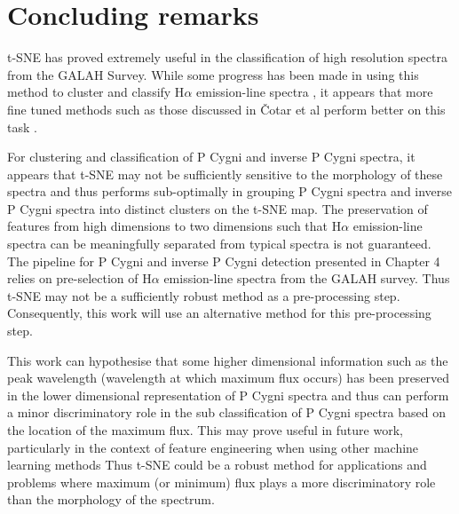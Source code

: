 \section{Concluding remarks}

t-SNE has proved extremely useful in the classification of high resolution spectra from the GALAH Survey. While some progress has been made in using this method to cluster and classify H$\alpha$ emission-line spectra \citep{traven2017galah}, it appears that more fine tuned methods such as those discussed in Čotar et al perform better on this task \citep{vcotar2021galah}.

For clustering and classification of P Cygni and inverse P Cygni spectra, it appears that t-SNE may not be sufficiently sensitive to the morphology of these spectra and thus performs sub-optimally in grouping P Cygni spectra and inverse P Cygni spectra into distinct clusters on the t-SNE map. The preservation of features from high dimensions to two dimensions such that H$\alpha$ emission-line spectra can be meaningfully separated from typical spectra is not guaranteed. The pipeline for P Cygni and inverse P Cygni detection presented in Chapter 4 relies on pre-selection of H$\alpha$ emission-line spectra from the GALAH survey. Thus t-SNE may not be a sufficiently robust method as a pre-processing step. Consequently, this work will use an alternative method for this pre-processing step.

This work can hypothesise that some higher dimensional information such as the peak wavelength (wavelength at which maximum flux occurs) has been preserved in the lower dimensional representation of P Cygni spectra and thus can perform a minor discriminatory role in the sub classification of P Cygni spectra based on the location of the maximum flux. This may prove useful in future work, particularly in the context of feature engineering when using other machine learning methods Thus t-SNE could be a robust method for applications and problems where maximum (or minimum) flux plays a more discriminatory role than the morphology of the spectrum.